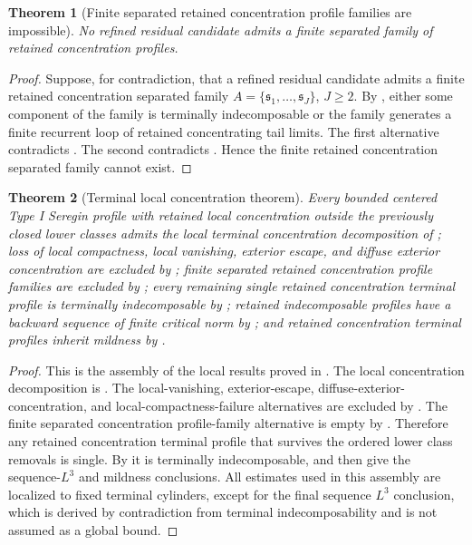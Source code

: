 \documentclass[11pt]{amsart}
\numberwithin{equation}{section}
\theoremstyle{plain}
\newtheorem{theorem}{Theorem}[section]
\theoremstyle{definition}
\theoremstyle{remark}
\begin{document}
\begin{theorem}[Finite separated retained concentration profile families are impossible]
\label{thm:no-finite-separated-profile-family}
No refined residual candidate admits a finite separated family of retained
concentration profiles.
\end{theorem}

\begin{proof}
Suppose, for contradiction, that a refined residual candidate admits a finite
retained concentration separated family \(A=\{\mathfrak s_1,\dots,\mathfrak s_J\}\),
\(J\ge2\).  By , either some component of the
family is terminally indecomposable
or the family generates a finite recurrent loop of retained concentrating tail
limits.  The first
alternative contradicts .  The second contradicts
.  Hence the finite retained concentration
separated family cannot exist.
\end{proof}

\begin{theorem}[Terminal local concentration theorem]
\label{thm:terminal-local-stratification-package}
Every bounded centered Type I Seregin profile with retained local concentration outside the
previously closed lower classes admits the local terminal concentration decomposition of
; loss of local compactness, local
vanishing, exterior escape, and diffuse exterior concentration are excluded by
; finite separated retained
concentration profile families are excluded by
; every remaining single retained
concentration terminal profile is terminally indecomposable by
; retained indecomposable profiles have a
backward sequence of finite critical norm by ; and
retained concentration terminal profiles inherit mildness by
.
\end{theorem}

\begin{proof}
This is the assembly of the local results proved in
.  The local concentration decomposition is
.  The local-vanishing, exterior-escape,
diffuse-exterior-concentration, and local-compactness-failure alternatives are
excluded by .  The finite separated
concentration profile-family alternative is empty by
.  Therefore any retained
concentration terminal profile that survives the ordered lower class removals is
single.  By  it is terminally
indecomposable, and then
 give the
sequence-\(L^3\) and mildness conclusions.  All estimates used in this assembly
are localized to fixed terminal cylinders, except for the final sequence
\(L^3\) conclusion, which is derived by contradiction from terminal
indecomposability and is not assumed as a global bound.
\end{proof}
\end{document}
